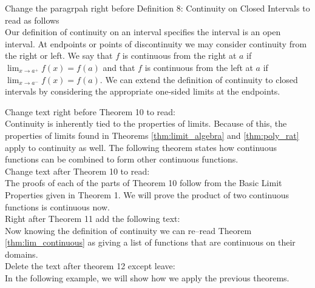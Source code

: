 \documentclass[10pt]{article}
\newcommand{\ds}{\displaystyle}
\begin{document}
Change the paragrpah right before Definition 8: Continuity on Closed Intervals to read as follows\\

Our definition of continuity on an interval specifies the interval is an open interval. At endpoints or points of discontinuity we may consider continuity from the right or left. We say that $f$ is continuous from the right at $a$ if $\ds \lim_{x\to a^+} f(x)=f(a)$ and that $f$ is continuous from the left at $a$ if  $\ds \lim_{x\to a^-} f(x)=f(a)$. We can extend the definition of continuity to closed intervals by considering the appropriate one-sided limits at the endpoints. 


Change text right before Theorem 10 to read:\\


Continuity is inherently tied to the properties of limits. Because of this, the properties of limits found in Theorems \ref{thm:limit_algebra} and \ref{thm:poly_rat} apply to continuity as well.  The following theorem states how continuous functions can be combined to form other continuous functions.
\\

Change text after Theorem 10 to read:\\
The proofs of each of the parts of  Theorem 10 follow from the Basic Limit Properties given in Theorem 1.
We will prove the product of two continuous functions is continuous now. \\


Right after Theorem 11 add the following text:\\

Now knowing the definition of continuity we can re--read Theorem \ref{thm:lim_continuous} as giving a list of functions that are continuous on their domains. \\


Delete the text after theorem 12 except leave:\\

  In the following example, we will show how we apply the previous theorems.
\end{document}
